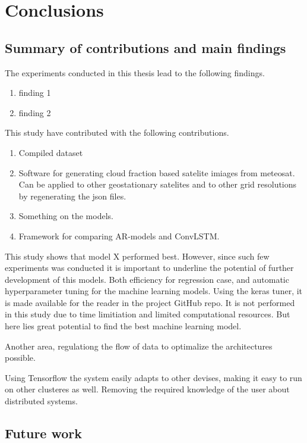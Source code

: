 \chapter{Conclusions}

\section{Summary of contributions and main findings }
The experiments conducted in this thesis lead to the following findings. 
\begin{enumerate}
    \item finding 1
    \item finding 2
\end{enumerate}

This study have contributed with the following contributions.
\begin{enumerate}
    \item Compiled dataset 
    \item Software for generating cloud fraction based satelite imiages from meteosat. Can be applied to other geostationary satelites and to other grid resolutions by regenerating the json files.
    \item Something on the models. 
    \item Framework for comparing AR-models and ConvLSTM.
\end{enumerate}

This study shows that model X performed best. However, since such few experiments was conducted it is important to underline the potential of further development of this models. Both efficiency for regression case, and automatic hyperparameter tuning for the machine learning models. Using the keras tuner, it is made available for the reader in the project GitHub repo. It is not performed in this study due to time limitiation and limited computational resources. But here lies great potential to find the best machine learning model. 

Another area, regulationg the flow of data to optimalize the architectures possible.

Using Tensorflow the system easily adapts to other devises, making it easy to run on other clusteres as well. Removing the required knowledge of the user about distributed systems. 



\section{Future work}

